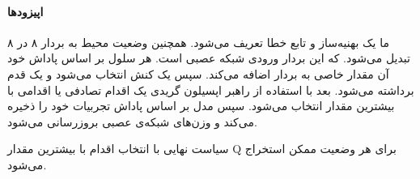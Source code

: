 \documentclass[11pt, a4paper, oneside]{report}
\begin{document}
\paragraph{اپیزودها}
ما یک بهنیه‌ساز و تابع خطا تعریف می‌شود. همچنین وضعیت محیط به بردار ۸ در ۸ تبدیل می‌شود. که این بردار ورودی شبکه عصبی است.
	هر سلول بر اساس پاداش خود آن مقدار خاصی به بردار اضافه می‌کند.
سپس یک کنش انتخاب می‌شود و یک قدم برداشته می‌شود. بعد با استفاده از راهبر اپسیلون گریدی یک اقدام تصادفی یا اقدامی با بیشترین مقدار انتخاب می‌شود.
سپس مدل بر اساس پاداش تجربیات خود را ذخیره می‌کند و وزن‌های شبکه‌ی  عصبی بروزرسانی می‌شود.
	
	 سیاست نهایی با انتخاب اقدام با بیشترین مقدار Q برای هر وضعیت ممکن استخراج می‌شود.
	

	
	
\end{document}
